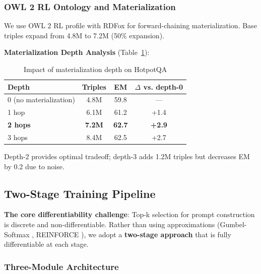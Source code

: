 \documentclass[10pt,twocolumn]{article}
\begin{document}
\subsubsection{OWL 2 RL Ontology and Materialization}
\label{sec:owl2rl}

We use OWL 2 RL profile \cite{motik2012owl2} with RDFox \cite{rdfox2023} for forward-chaining materialization. Base triples expand from 4.8M to 7.2M (50\% expansion).

\textbf{Materialization Depth Analysis} (Table~\ref{tab:materialization_depth}):

\begin{table}[h]
\centering
\caption{Impact of materialization depth on HotpotQA}
\label{tab:materialization_depth}
\small
\begin{tabular}{@{}lccc@{}}
\toprule
\textbf{Depth} & \textbf{Triples} & \textbf{EM} & \textbf{$\Delta$ vs. depth-0} \\
\midrule
0 (no materialization) & 4.8M & 59.8 & --- \\
1 hop & 6.1M & 61.2 & +1.4 \\
\textbf{2 hops} & \textbf{7.2M} & \textbf{62.7} & \textbf{+2.9} \\
3 hops & 8.4M & 62.5 & +2.7 \\
\bottomrule
\end{tabular}
\end{table}

Depth-2 provides optimal tradeoff; depth-3 adds 1.2M triples but decreases EM by 0.2 due to noise.



\subsection{Two-Stage Training Pipeline}
\label{sec:training}

\textbf{The core differentiability challenge}: Top-k selection for prompt construction is discrete and non-differentiable. Rather than using approximations (Gumbel-Softmax \cite{jang2017gumbel}, REINFORCE \cite{williams1992reinforce}), we adopt a \textbf{two-stage approach} that is fully differentiable at each stage.

\subsubsection{Three-Module Architecture}
\label{sec:modules}
\end{document}
